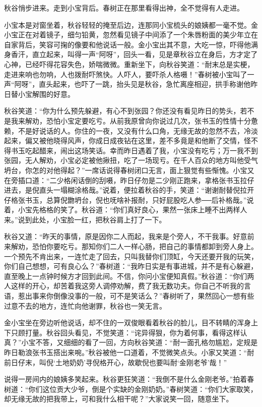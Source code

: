 \documentclass[12pt,UTF8]{ctexbook}
\begin{document}
{{{秋谷悄步进来。走到小宝背后。春树正在那里看得出神，全不觉得有人走进。

小宝本是对窗坐着，秋谷轻轻的掩至后边，连那同小宝梳头的娘姨都一毫不觉。金小宝正在对着镜子，细匀铅黄，忽然看见镜子中间添了一个朱唇粉面的美少年立在自家背后，笑容可掬的像要和他说话一般。金小宝出其不意，大吃一惊，吓得他满身香汗，直立起来，叫得一声“阿呀”，回头一看，见是章秋谷立在身后，方才定了心神，已经吓得花容失色，娇喘微微。重新坐下，向秋谷笑道：“耐末总是实梗，走进来响也勿响，人也拨耐吓煞快。人吓人，要吓杀人格嗫！”春树被小宝叫了一声“阿呀”，直头起来，也吓了一跳，抬头见是秋谷，急忙离座相迎，拱手称谢他昨日替小宝解围的好意。

秋谷笑道：“你为什么预先躲避，有心不到张园？你还没有看见昨日的势头，若不是我来解劝，恐怕小宝定要吃亏。从前我原曾向你说过几次，张书玉的性情十分惫赖，不是好说话的人。你住的一夜，又没有什么口角，无缘无故的忽然不去，冷淡起来，偏又被他晓得风声，你成日成夜钻在这里，差不多竟是和他断了交情，怪不得书玉吃起醋来，闹出这场笑话。幸而昨日遇着了我，小宝没有吃亏；万一我不到张园，无人解劝，小宝必定被他揪扭，吃了一场现亏。在千人百众的地方叫他受气坍台，你怎的对他得起？”一席话说得春树闭口无言，面上狠觉有些惭愧。小宝又在旁插口道：“二少格闲话倒的刮嗫，昨日仔勿是二少刚正跑来，拿格张书玉拉仔进去，是倪直头一塌糊涂格哉。”说着，便拉着秋谷的手，笑道：“谢谢耐替倪拉开仔格张书玉，总算倪朆坍台，倪也呒啥补报耐，只好屁股吃人参──后补格哉。”说着，小宝先格格的笑了。秋谷道：“你们真好良心，果然一张床上睡不出两样人来。”说到此处，小宝脸一红，把秋谷肩上打了一下。

秋谷又道：“昨天的事情，原是因你二人而起，我来是个旁人，不干我事。好意前来解劝，恐怕你要吃亏。那知你们二人一样心肠，把自己的事情都卸到旁人身上。一个预先不肯出来，一连忙走了回去，只叫我替你们顶缸，今天还要开我的玩笑，你们自己想想，可有良心么？”春树道：“我昨日实是有事进城，并不是有心躲避，直至晚上一点钟时候方才回到此间。不信，你问小宝便知真假。”秋谷道：“你们两人这样的开心，却苦着我这旁人调停劝解，费了我无数功夫。你自己不听我的言语，惹出事来你倒像没事的一般，可不是笑话么？”春树听了，果然回心一想有些过意不去的地方，连忙向他谢罪，秋谷也一笑无言。

金小宝坐在旁边听他说话，却不住的一双俊眼看着秋谷的脸儿，目不转睛的浑身上下只顾打量。秋谷回头看见，不觉笑道：“诧异得狠，你为着何事，看得这样认真？”小宝不答，又细细的看了一回，方向秋谷笑道：“耐一面孔格勿尴尬，定规是昨日勒浪张书玉搭出来啘。”秋谷被他一口道着，不觉微笑点头。小家又笑道：“耐前日仔末，叫倪‘土地奶奶’寻倪格开心，故歇倪也要叫耐‘金刚老爷’哉！”

说得一房间内的娘姨多笑起来。秋谷更狂笑道：“我倒不是什么金刚老爷。”拍着春树道：“你们这位贡大少爷，倒是个实缺的金刚奶奶。”春树笑道：“你们大家取笑，却无缘无故的把我带上，可和我什么相干呢？”大家说笑一回，随意坐下。

}}}
\end{document}

